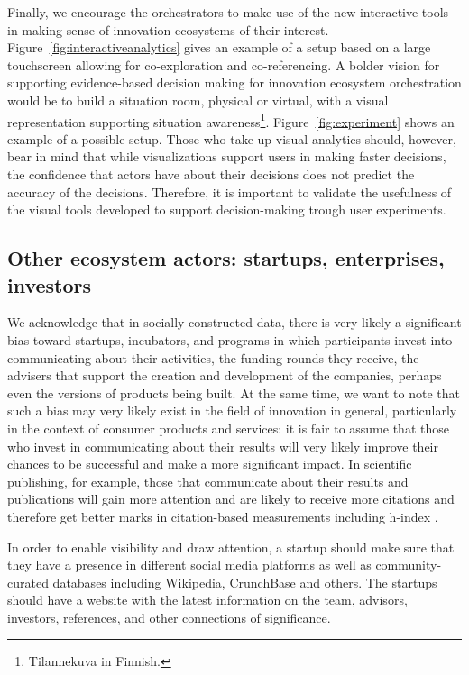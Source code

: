 Finally, we encourage the orchestrators to make use of the new interactive tools in making sense of innovation ecosystems of their interest. Figure~\ref{fig:interactiveanalytics} gives an example of a setup based on a large touchscreen allowing for co-exploration and co-referencing. A bolder vision for supporting evidence-based decision making for innovation ecosystem orchestration would be to build a situation room, physical or virtual, with a visual representation supporting situation awareness\footnote{Tilannekuva in Finnish.}. Figure~\ref{fig:experiment} shows an example of a possible setup. Those who take up visual analytics should, however, bear in mind that while visualizations support users in making faster decisions, the confidence that actors have about their decisions does not predict the accuracy of the decisions. Therefore, it is important to validate the usefulness of the visual tools developed to support decision-making trough user experiments.

\subsection{Other ecosystem actors: startups, enterprises, investors}

We acknowledge that in socially constructed data, there is very likely a significant bias toward startups, incubators, and programs in which participants invest into communicating about their activities, the funding rounds they receive, the advisers that support the creation and development of the companies, perhaps even the versions of products being built. At the same time, we want to note that such a bias may very likely exist in the field of innovation in general, particularly in the context of consumer products and services: it is fair to assume that those who invest in communicating about their results will very likely improve their chances to be successful and make a more significant impact. In scientific publishing, for example, those that communicate about their results and publications will gain more attention and are likely to receive more citations and therefore get better marks in citation-based measurements including h-index \citep[cf.][]{Terras2012}. 

In order to enable visibility and draw attention, a startup should make sure that they have a presence in different social media platforms as well as community-curated databases including Wikipedia, CrunchBase and others. The startups should have a website with the latest information on the team, advisors, investors, references, and other connections of significance. 

